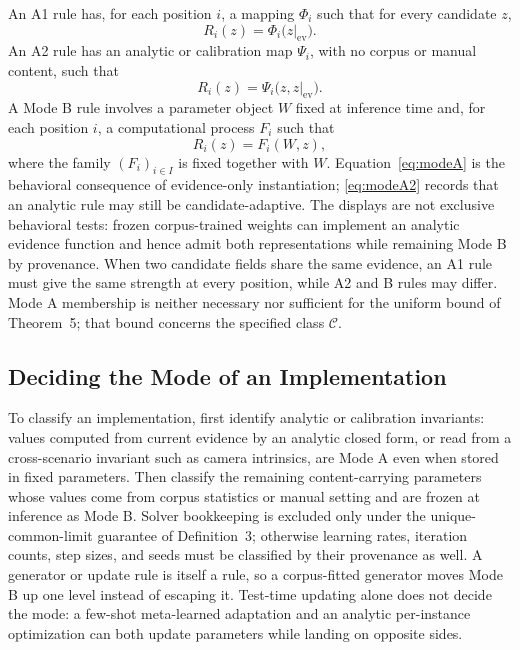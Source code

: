 \documentclass[twoside,11pt]{article}
\newcommand{\ev}{\mathrm{ev}}
\begin{document}
An A1 rule has, for each position $i$, a mapping $\Phi_i$ such that for every candidate $z$,
\begin{equation}
R_i(z) = \Phi_i\bigl(z|_{\ev}\bigr).
\label{eq:modeA}%
\end{equation}%
An A2 rule has an analytic or calibration map $\Psi_i$, with no corpus or manual content, such that
\begin{equation}
R_i(z) = \Psi_i\bigl(z, z|_{\ev}\bigr).
\label{eq:modeA2}%
\end{equation}%
A Mode B rule involves a parameter object $W$ fixed at inference time and, for each position $i$, a computational process $F_i$ such that
\begin{equation}
R_i(z) = F_i(W, z),
\label{eq:modeB}%
\end{equation}%
where the family $(F_i)_{i \in I}$ is fixed together with $W$. Equation~\eqref{eq:modeA} is the behavioral consequence of evidence-only instantiation; \eqref{eq:modeA2} records that an analytic rule may still be candidate-adaptive. The displays are not exclusive behavioral tests: frozen corpus-trained weights can implement an analytic evidence function and hence admit both representations while remaining Mode B by provenance. When two candidate fields share the same evidence, an A1 rule must give the same strength at every position, while A2 and B rules may differ. Mode A membership is neither necessary nor sufficient for the uniform bound of Theorem~5; that bound concerns the specified class $\mathcal{C}$.

\subsection{Deciding the Mode of an Implementation}
\label{sec:procedure}%

To classify an implementation, first identify analytic or calibration invariants: values computed from current evidence by an analytic closed form, or read from a cross-scenario invariant such as camera intrinsics, are Mode A even when stored in fixed parameters. Then classify the remaining content-carrying parameters whose values come from corpus statistics or manual setting and are frozen at inference as Mode B. Solver bookkeeping is excluded only under the unique-common-limit guarantee of Definition~3; otherwise learning rates, iteration counts, step sizes, and seeds must be classified by their provenance as well. A generator or update rule is itself a rule, so a corpus-fitted generator moves Mode B up one level instead of escaping it. Test-time updating alone does not decide the mode: a few-shot meta-learned adaptation and an analytic per-instance optimization can both update parameters while landing on opposite sides.
\end{document}
